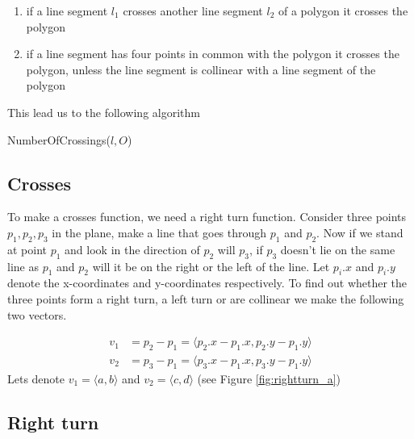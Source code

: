\begin{enumerate}
	\item if a line segment $l_1$ crosses another line segment $l_2$ of a polygon it 
	      crosses the polygon
	\item if a line segment has four points in common with the polygon it crosses the
		  polygon, unless the line segment is collinear with a line segment of the
		  polygon 
\end{enumerate}

This lead us to the following algorithm
\begin{algorithm} 
	\caption{NumberOfCrossings($l,O$)}
	\begin{algorithmic}[1] 
				\Else
				\EndIf
			\EndFor
			\EndIf
		\EndFor
	\end{algorithmic}
\end{algorithm}

\subsection{Crosses}
To make a crosses function, we need a right turn function. Consider three
points $p_1,p_2,p_3$ in the plane, make a line that goes through $p_1$ and $p_2$. 
Now if we stand at point $p_1$ and look in the direction of $p_2$ will $p_3$, if $p_3$
doesn't lie on the same line as $p_1$ and $p_2$ will it be on the
right or the left of the line. Let $p_i.x$ and $p_i.y$ denote the x-coordinates
and y-coordinates respectively. To find out whether the three points form a right turn, 
a left turn or are collinear we make the following two vectors.

\begin{align*}
	v_1 &=p_2-p_1 = \langle p_2.x-p_1.x,p_2.y-p_1.y\rangle\\
	v_2 &=p_3-p_1 = \langle p_3.x-p_1.x,p_3.y-p_1.y\rangle
\end{align*}
Lets denote $v_1 = \langle a,b\rangle$ and $v_2 = \langle c,d\rangle$
(see Figure \ref{fig:rightturn_a})

\subsection{Right turn}

